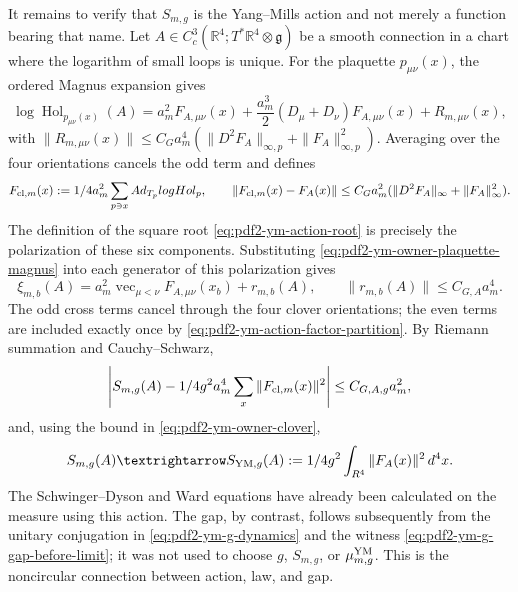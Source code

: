 It remains to verify that $S_{m,g}$ is the Yang--Mills action and not merely a
function bearing that name. Let
$A\in C_c^3(\mathbb R^4;T^*\mathbb R^4\otimes\mathfrak g)$ be a smooth connection in
a chart where the logarithm of small loops is unique. For the plaquette
$p_{\mu\nu}(x)$, the ordered Magnus expansion gives
\begin{equation}\label{eq:pdf2-ym-owner-plaquette-magnus}
 \log\operatorname{Hol}_{p_{\mu\nu}(x)}(A)
 =a_m^2F_{A,\mu\nu}(x)
  +\frac{a_m^3}{2}(D_\mu+D_\nu)F_{A,\mu\nu}(x)
  +R_{m,\mu\nu}(x),
\end{equation}
with
$\|R_{m,\mu\nu}(x)\|\le C_G a_m^4
(\|D^2F_A\|_{\infty,p}+\|F_A\|_{\infty,p}^2)$.
Averaging over the four orientations cancels the odd term and defines
\begin{equation}\label{eq:pdf2-ym-owner-clover}
 F_{{\rm cl},m}(x)
 :=\frac1{4a_m^2}\sum_{p\ni x}
  \operatorname{Ad}_{T_p}\log\operatorname{Hol}_p,
 \qquad
 \|F_{{\rm cl},m}(x)-F_A(x)\|
 \le C_G a_m^2(\|D^2F_A\|_\infty+\|F_A\|_\infty^2).
\end{equation}
The definition of the square root
\eqref{eq:pdf2-ym-action-root} is precisely the polarization of these six
components. Substituting \eqref{eq:pdf2-ym-owner-plaquette-magnus} into each
generator of this polarization gives
\begin{equation}\label{eq:pdf2-ym-owner-action-root-smooth-chart}
 \xi_{m,b}(A)
 =a_m^2\operatorname{vec}_{\mu<\nu}F_{A,\mu\nu}(x_b)
  +r_{m,b}(A),
 \qquad
 \|r_{m,b}(A)\|\le C_{G,A}a_m^4.
\end{equation}
The odd cross terms cancel through the four clover orientations;
the even terms are included exactly once by
\eqref{eq:pdf2-ym-action-factor-partition}. By Riemann summation and
Cauchy--Schwarz,
\begin{equation}\label{eq:pdf2-ym-owner-action-error}
 \left|S_{m,g}(A)-\frac1{4g^2}
  a_m^4\sum_x\|F_{{\rm cl},m}(x)\|^2\right|
 \le C_{G,A,g}a_m^2,
\end{equation}
and, using the bound in \eqref{eq:pdf2-ym-owner-clover},
\begin{equation}\label{eq:pdf2-ym-owner-f2}
 S_{m,g}(A)\longrightarrow
 S_{{\rm YM},g}(A):=\frac1{4g^2}
 \int_{\mathbb R^4}\|F_A(x)\|^2\,d^4x.
\end{equation}
The Schwinger--Dyson and Ward equations have already been calculated on the measure using
this action. The gap, by contrast, follows subsequently from the unitary conjugation in
\eqref{eq:pdf2-ym-g-dynamics} and the witness
\eqref{eq:pdf2-ym-g-gap-before-limit}; it was not used to choose $g$, $S_{m,g}$, or
$\widehat\mu_{m,g}^{\rm YM}$. This is the noncircular connection between action, law, and gap.

